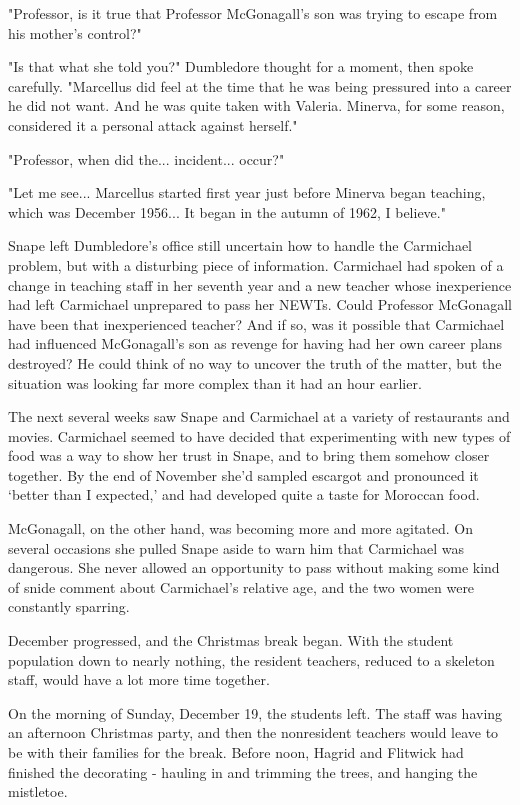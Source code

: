 \documentclass[a4paper,11pt]{article}
\begin{document}
"Professor, is it true that Professor McGonagall's son was trying to escape from his mother's control?"

"Is that what she told you?" Dumbledore thought for a moment, then spoke carefully. "Marcellus did feel at the time that he was being pressured into a career he did not want. And he was quite taken with Valeria. Minerva, for some reason, considered it a personal attack against herself."

"Professor, when did the... incident... occur?"

"Let me see... Marcellus started first year just before Minerva began teaching, which was December 1956... It began in the autumn of 1962, I believe."

Snape left Dumbledore's office still uncertain how to handle the Carmichael problem, but with a disturbing piece of information. Carmichael had spoken of a change in teaching staff in her seventh year and a new teacher whose inexperience had left Carmichael unprepared to pass her NEWTs. Could Professor McGonagall have been that inexperienced teacher? And if so, was it possible that Carmichael had influenced McGonagall's son as revenge for having had her own career plans destroyed? He could think of no way to uncover the truth of the matter, but the situation was looking far more complex than it had an hour earlier.

The next several weeks saw Snape and Carmichael at a variety of restaurants and movies. Carmichael seemed to have decided that experimenting with new types of food was a way to show her trust in Snape, and to bring them somehow closer together. By the end of November she'd sampled escargot and pronounced it `better than I expected,' and had developed quite a taste for Moroccan food.

McGonagall, on the other hand, was becoming more and more agitated. On several occasions she pulled Snape aside to warn him that Carmichael was dangerous. She never allowed an opportunity to pass without making some kind of snide comment about Carmichael's relative age, and the two women were constantly sparring.

December progressed, and the Christmas break began. With the student population down to nearly nothing, the resident teachers, reduced to a skeleton staff, would have a lot more time together.

On the morning of Sunday, December 19, the students left. The staff was having an afternoon Christmas party, and then the nonresident teachers would leave to be with their families for the break. Before noon, Hagrid and Flitwick had finished the decorating - hauling in and trimming the trees, and hanging the mistletoe.
\end{document}
